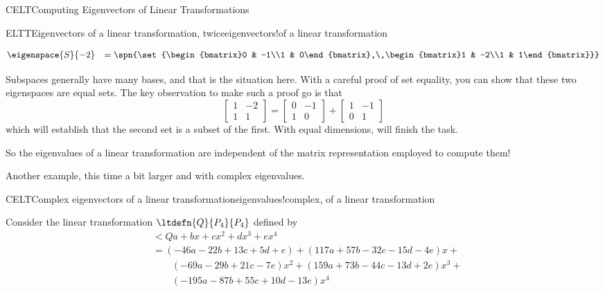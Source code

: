 \begin{subsect}{CELT}{Computing Eigenvectors of Linear Transformations}
\begin{example}{ELTT}{Eigenvectors of a linear transformation, twice}{eigenvectors!of a linear transformation}
\begin{para}
\begin{align*}
&
\eigenspace{S}{-2}&=
\spn{\set{\begin{bmatrix}0 & -1\\1 & 0\end{bmatrix},\,\begin{bmatrix}1 & -2\\1 & 1\end{bmatrix}}}
%
\end{align*}
\end{para}
%
\begin{para}Subspaces generally have many bases, and that is the situation here.  With a careful proof of set equality, you can show that these two eigenspaces are equal sets.  The key observation to make such a proof go is that
%
\begin{equation*}
\begin{bmatrix}1 & -2\\1 & 1\end{bmatrix}
=
\begin{bmatrix}0 & -1\\1 & 0\end{bmatrix}+\begin{bmatrix}1 & -1\\0 & 1\end{bmatrix}
\end{equation*}
%
which will establish that the second set is a subset of the first.  With equal dimensions,  will finish the task.\end{para}
%
\begin{para}So the eigenvalues of a linear transformation are independent of the matrix representation employed to compute them!\end{para}
%
\end{example}
%
\begin{para}Another example, this time a bit larger and with complex eigenvalues.\end{para}
%
\begin{example}{CELT}{Complex eigenvectors of a linear transformation}{eigenvalues!complex, of a linear transformation}
\begin{para}Consider the linear transformation $\ltdefn{Q}{P_4}{P_4}$ defined by
%
\begin{align*}
&\lt{Q}{a+bx+cx^2+dx^3+ex^4}\\
&=(-46a-22b+13c+5d+e)+(117a+57b-32c-15d-4e) x+\\
&\quad\quad (-69a-29b+21c-7e)x^2+(159a+73b-44c-13d+2e)x^3+\\
&\quad\quad (-195a-87b+55c+10d-13e)x^4

\end{align*}
\end{para}
\end{example}
\end{subsect}
